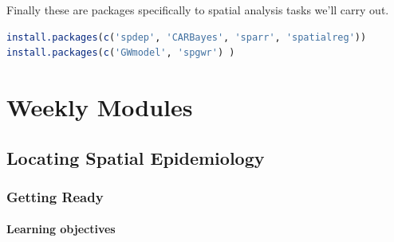 \documentclass[
]{book}
\begin{document}
Finally these are packages specifically to spatial analysis tasks we'll carry out.

\begin{lstlisting}[language=R]
install.packages(c('spdep', 'CARBayes', 'sparr', 'spatialreg'))
install.packages(c('GWmodel', 'spgwr') )
\end{lstlisting}

\hypertarget{part-weekly-modules}{%
\part{Weekly Modules}\label{part-weekly-modules}}

\hypertarget{locating-spatial-epidemiology}{%
\chapter{Locating Spatial Epidemiology}\label{locating-spatial-epidemiology}}

\hypertarget{getting-ready}{%
\section{Getting Ready}\label{getting-ready}}

\hypertarget{learning-objectives}{%
\subsection{Learning objectives}\label{learning-objectives}}

 
  \providecommand{\huxb}[2]{\arrayrulecolor[RGB]{#1}\global\arrayrulewidth=#2pt}
  \providecommand{\huxvb}[2]{\color[RGB]{#1}\vrule width #2pt}
  \providecommand{\huxtpad}[1]{\rule{0pt}{#1}}
  \providecommand{\huxbpad}[1]{\rule[-#1]{0pt}{#1}}
\end{document}
